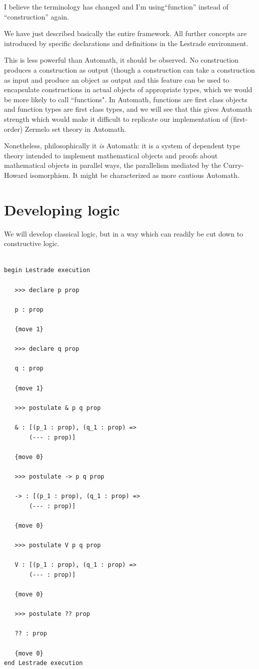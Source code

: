 \documentclass[12pt]{article}
\begin{document}
I believe the terminology has changed and I'm using``function'' instead of ``construction'' again.

We have just described basically the entire framework.  All further concepts are introduced by specific declarations and definitions in the Lestrade environment.

This is less powerful than Automath, it should be observed.  No construction produces a construction as output (though a construction can take a construction as input and produce an object as output and this feature can be used to encapsulate constructions in actual objects of appropriate types, which we would be more likely to call ``functions".  In Automath, functions are first class objects and function types are first class types, and we will see that this gives Automath strength which would make it difficult to replicate our implementation of (first-order) Zermelo set theory in Automath.

Nonetheless, philosophically it {\em is\/} Automath:  it is a system of dependent type theory intended to implement mathematical objects and proofs about mathematical objects in parallel ways, the parallelism mediated by the Curry-Howard isomorphism.   It might be characterized as more cautious Automath.



\section{Developing logic}

We will develop classical logic, but in a way which can readily be cut down to constructive logic.

\begin{verbatim}

begin Lestrade execution

   >>> declare p prop

   p : prop

   {move 1}

   >>> declare q prop

   q : prop

   {move 1}

   >>> postulate & p q prop

   & : [(p_1 : prop), (q_1 : prop) => 
       (--- : prop)]

   {move 0}

   >>> postulate -> p q prop

   -> : [(p_1 : prop), (q_1 : prop) => 
       (--- : prop)]

   {move 0}

   >>> postulate V p q prop

   V : [(p_1 : prop), (q_1 : prop) => 
       (--- : prop)]

   {move 0}

   >>> postulate ?? prop

   ?? : prop

   {move 0}
end Lestrade execution
\end{verbatim}
\end{document}
